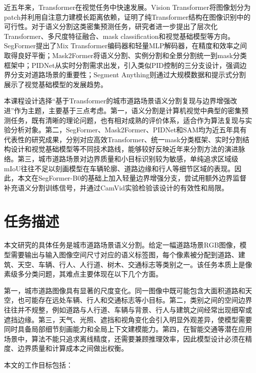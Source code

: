 \documentclass{report}
\begin{document}
近五年来，Transformer在视觉任务中快速发展。Vision Transformer将图像划分为patch并利用自注意力建模长距离依赖，证明了纯Transformer结构在图像识别中的可行性。对于语义分割这类密集预测任务，研究者进一步提出了层次化Transformer、多尺度特征融合、mask classification和视觉基础模型等方向。SegFormer提出了Mix Transformer编码器和轻量MLP解码器，在精度和效率之间取得良好平衡\cite{segformer}；Mask2Former将语义分割、实例分割和全景分割统一到mask分类框架中\cite{mask2former}；PIDNet从实时分割需求出发，引入类似PID控制的三分支设计，强调边界分支对道路场景的重要性\cite{pidnet}；Segment Anything则通过大规模数据和提示式分割展示了视觉基础模型的发展趋势\cite{sam}。

本课程设计选择“基于Transformer的城市道路场景语义分割复现与边界增强改进”作为主题，主要基于三点考虑。第一，语义分割是计算机视觉中典型的密集预测任务，既有清晰的理论问题，也有相对成熟的评价体系，适合作为算法复现与实验分析对象。第二，SegFormer、Mask2Former、PIDNet和SAM均为近五年具有代表性的研究成果，分别对应高效Transformer、统一mask分类框架、实时分割结构设计和视觉基础模型等不同技术路线，能够较好反映近年来分割方法的演进脉络。第三，城市道路场景对边界质量和小目标识别较为敏感，单纯追求区域级mIoU往往不足以刻画模型在车辆轮廓、道路边缘和行人等细节区域的表现。因此，本文在SegFormer-B0的基础上加入轻量边界增强分支，尝试用额外边界监督补充语义分割训练信号，并通过CamVid实验检验该设计的有效性和局限。

\section{任务描述}

本文研究的具体任务是城市道路场景语义分割。给定一幅道路场景RGB图像，模型需要输出与输入图像空间尺寸对应的语义标签图，每个像素被分配到道路、建筑、天空、车辆、行人、人行道、树木、交通标志等类别之一。该任务本质上是像素级多分类问题，其难点主要体现在以下几个方面。

第一，城市道路图像具有显著的尺度变化。同一图像中既可能包含大面积道路和天空，也可能存在远处车辆、行人和交通标志等小目标。第二，类别之间的空间边界往往并不规整，例如道路与人行道、车辆与背景、行人与建筑之间经常出现细窄或遮挡边缘。第三，天气、光照、遮挡和视角变化会引入明显外观差异，使模型需要同时具备局部细节刻画能力和全局上下文建模能力。第四，在智能交通等潜在应用场景中，算法不能只追求离线精度，还需要兼顾推理效率，因此模型设计必须在精度、边界质量和计算成本之间做出权衡。

本文的工作目标包括：
\end{document}
